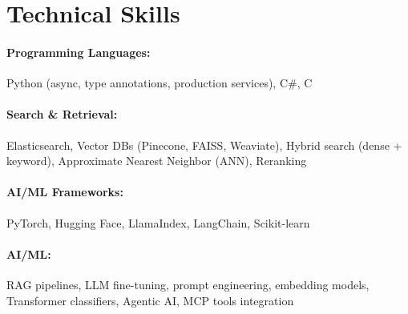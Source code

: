 \documentclass[10pt, letterpaper]{article}
\newenvironment{onecolentry}{
    \begin{adjustwidth}{
        0 cm + 0.00001 cm
    }{
        0 cm + 0.00001 cm
    }
}{
    \end{adjustwidth}
} %
\begin{document}
        




\vspace{-1mm}
\section{Technical Skills}

        \paragraph{Programming Languages:} Python (async, type annotations, production services), C\#, C
        \vspace{-4mm}
        \paragraph{Search \& Retrieval:} Elasticsearch, Vector DBs (Pinecone, FAISS, Weaviate), Hybrid search (dense + keyword), Approximate Nearest Neighbor (ANN), Reranking
        \vspace{-4mm}
        \paragraph{AI/ML Frameworks:} PyTorch, Hugging Face, LlamaIndex, LangChain, Scikit-learn
        \vspace{-4mm}
        \paragraph{AI/ML:} RAG pipelines, LLM fine-tuning, prompt engineering, embedding models, Transformer classifiers, Agentic AI, MCP tools integration
        \vspace{-4mm}
\end{document}
